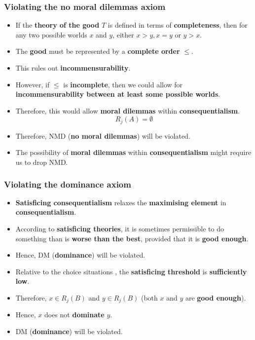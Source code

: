 \documentclass[11pt]{article}
\begin{document}
\subsubsection{Violating the no moral dilemmas axiom}
\label{sec:org808f068}
\begin{itemize}
\item If the \textbf{theory of the good} \(T\) is defined in terms of \textbf{completeness}, then for any two possible worlds \(x\) and \(y\), either \(x > y, x = y\) or \(y > x\).
\item The \textbf{good} must be represented by a \textbf{complete order} \(\le\).
\item This rules out \textbf{incommensurability}.
\item However, if \(\le\) is \textbf{incomplete}, then we could allow for \textbf{incommensurability between at least some possible worlds}.
\item Therefore, this would allow \textbf{moral dilemmas} within \textbf{consequentialism}.
\[R_j (A) = \emptyset\]
\item Therefore, NMD (\textbf{no moral dilemmas}) will be violated.
\item The possibility of \textbf{moral dilemmas} within \textbf{consequentialism} might require us to drop NMD.
\end{itemize}

 \newpage
\subsubsection{Violating the dominance axiom}
\label{sec:orgbdbacf4}
\begin{itemize}
\item \textbf{Satisficing consequentialism} relaxes the \textbf{maximising element} in \textbf{consequentialism}.
\item According to \textbf{satisficing theories}, it is sometimes permissible to do something than is \textbf{worse than the best}, provided that it is \textbf{good enough}.
\item Hence, DM (\textbf{dominance}) will be violated.
\item Relative to the choice situations \(<j, B>\), the \textbf{satisficing threshold} is \textbf{sufficiently low}.
\item Therefore, \(x \in R_j (B)\) and \(y \in R_j (B)\) (both \(x\) and \(y\) are \textbf{good enough}).
\item Hence, \(x\) does not \textbf{dominate} \(y\).
\item DM (\textbf{dominance}) will be violated.
\end{itemize}
\end{document}
